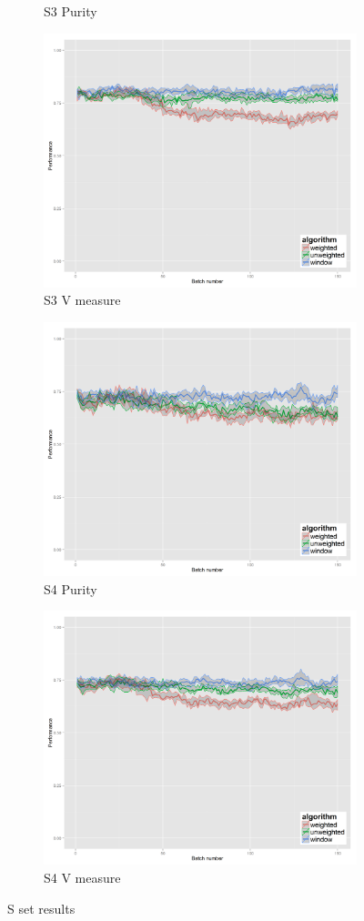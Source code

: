\begin{figure}[H]
\begin{subfigure}{.45\textwidth}
  \caption{S3 Purity}
\end{subfigure}%
\begin{subfigure}{.45\textwidth}
  \centering
  \includegraphics[width=.7\linewidth]{s_set/s_set_3_ci_one_size_vmeasure.png}
  \caption{S3 V measure}
\end{subfigure}
\begin{subfigure}{.45\textwidth}
  \centering
  \includegraphics[width=.7\linewidth]{s_set/s_set_4_ci_one_size_purity.png}
  \caption{S4 Purity}
\end{subfigure}%
\begin{subfigure}{.45\textwidth}
  \centering
  \includegraphics[width=.7\linewidth]{s_set/s_set_4_ci_one_size_vmeasure.png}
  \caption{S4 V measure}
\end{subfigure}
\caption{S set results}
\label{fig:s_set_results}
\end{figure}

